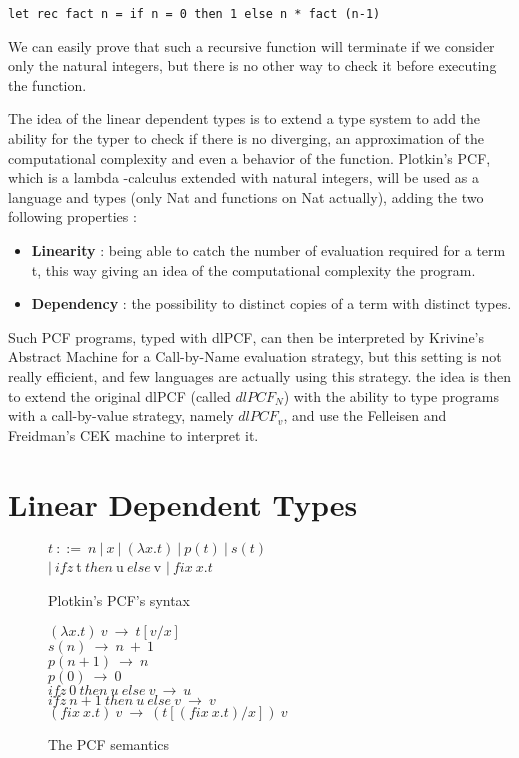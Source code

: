 \documentclass[a4paper,12pt]{report}
\begin{document}
\begin{verbatim}
let rec fact n = if n = 0 then 1 else n * fact (n-1)
\end{verbatim}

We can easily prove that such a recursive function will terminate if we consider
only the natural integers, but there is no other way to check it before
executing the function.

The idea of the linear dependent types is to extend a type system to add the
ability for the typer to check if there is no diverging, an approximation of the
computational complexity and even a behavior of the function. Plotkin's PCF,
which is a lambda -calculus extended with natural integers, will be used as a
language and types (only Nat and functions on Nat actually), adding the two
following properties :
\begin{itemize}
\item \textbf{Linearity} : being able to catch the number of evaluation required
  for a term t, this way giving an idea of the computational complexity the
  program.
\item \textbf{Dependency} : the possibility to distinct copies of a term with
  distinct types.
\end{itemize}

Such PCF programs, typed with dlPCF, can then be interpreted by Krivine's
Abstract Machine for a Call-by-Name evaluation strategy, but this setting is not
really efficient, and few languages are actually using this strategy. the idea
is then to extend the original dlPCF (called $ dlPCF_{N} $) with the ability to type
programs with a call-by-value strategy, namely $ dlPCF_{v} $, and use the Felleisen and
Freidman's CEK machine to interpret it.

\section{Linear Dependent Types}

\begin{figure}
  \begin{center}
    $t~::=~n~|~x~|~(\lambda x.t)~|~p(t)~|~s(t)$ \\
    $|~ifz~$t$~then~$u$~else~$v $|~fix~x.t$
  \end{center}
  \caption{Plotkin's PCF's syntax}
  \label{pcf-syntax}
\end{figure}

\begin{figure}
  \begin{center}
    $(\lambda x.t)~v~\rightarrow~ t[v/x]$ \\
    $s(n)~\rightarrow~ n~+~1$ \\
    $p(n+1)~\rightarrow~ n$ \\
    $p(0)~\rightarrow~ 0$ \\
    $ifz~0~then~u~else~v~\rightarrow~u$ \\
    $ifz~n+1~then~u~else~v~\rightarrow~v$ \\
    $(fix~x.t)~v~\rightarrow~(t[(fix~x.t)/x])~v$
  \end{center}
  \caption{The PCF semantics}
  \label{pcf-sem}
\end{figure}
\end{document}
